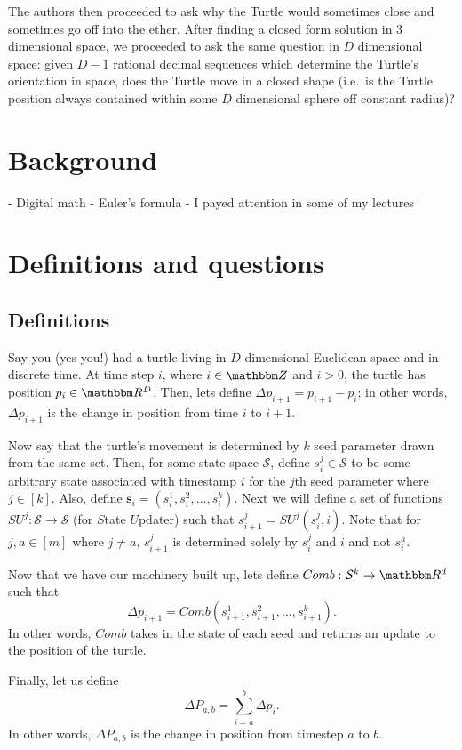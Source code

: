 \documentclass[11pt,titlepage]{article}
\newcommand{\combWithState}[1]{Comb\left(s^1_{#1}, s^2_{#1}, ..., s^k_{#1}\right)}
\begin{document}
The authors then proceeded to ask why the Turtle would sometimes close and sometimes
go off into the ether. After finding a closed form solution in 3 dimensional space,
we proceeded to ask the same question in $D$ dimensional space: given $D - 1$ 
rational decimal sequences which determine the Turtle's orientation in space,
does the Turtle move in a closed shape (i.e.\ is the Turtle position always contained
within some $D$ dimensional sphere off constant radius)?

\section{Background}
- Digital math
- Euler's formula
- I payed attention in some of my lectures

\section{Definitions and questions}
\subsection{Definitions}
Say you (yes you!) had a turtle living in $D$ dimensional Euclidean
space and in discrete time. At time step $i$, where $i \in \Z$ and $i > 0$,
the turtle has position $p_i \in \R^D$.
Then, lets define $\Delta p_{i+1} = p_{i+1} - p_i$; in other words, $\Delta p_{i+1}$ is the change in position from time $i$ to $i + 1$.

Now say that the turtle's movement is determined by $k$ seed parameter drawn from
the same set. Then, for some state space $\mathcal{S}$,
define $s_i^j \in \mathcal{S}$ to be some arbitrary
state associated with timestamp $i$ for the $j$th seed parameter where $j \in [k]$.
Also, define $\pmb{s}_i = (s_i^1, s_i^2, ..., s_i^k)$.
Next we will define a set of functions $SU^j: \mathcal{S} \rightarrow \mathcal{S}$
(for $S$tate $U$pdater) such that $s_{i + 1}^j = SU^j(s_i^j, i)$. Note that for
$j, a \in [m]$ where $j \neq a$, $s_{i+1}^j$ is determined solely by $s_i^j$ and $i$ and not
$s_i^a$.

Now that we have our machinery built up, lets define $Comb: \mathcal{S}^k \rightarrow \R^d$ such that
$$
  \Delta p_{i + 1} = \combWithState{i + 1}.
$$
In other words, $Comb$ takes in the state of each seed and
returns an update to the position of the turtle.

Finally, let us define
$$
  \Delta P_{a, b} = \sum_{i = a}^{b} \Delta p_i.
$$
In other words, $\Delta P_{a, b}$ is the change in position from timestep $a$ to $b$.
\end{document}
